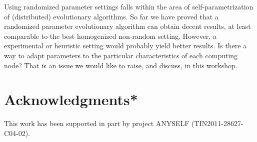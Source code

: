 \documentclass{llncs}
\begin{document}
Using randomized parameter settings falls within the area of
self-parametrization of (distributed) evolutionary algorithms. So far
we have proved that a randomized parameter evolutionary algorithm can
obtain decent results, at least comparable to the best homogenized
non-random setting. However, a experimental or heuristic setting would
probably yield better results. Is there a way to adapt parameters to
the particular characteristics of each computing node? That is an
issue we would like to raise, and discuss, in this workshop. 


\section{Acknowledgments*}

This work has been supported in part by project ANYSELF
(TIN2011-28627-C04-02). 

%


\end{document}

